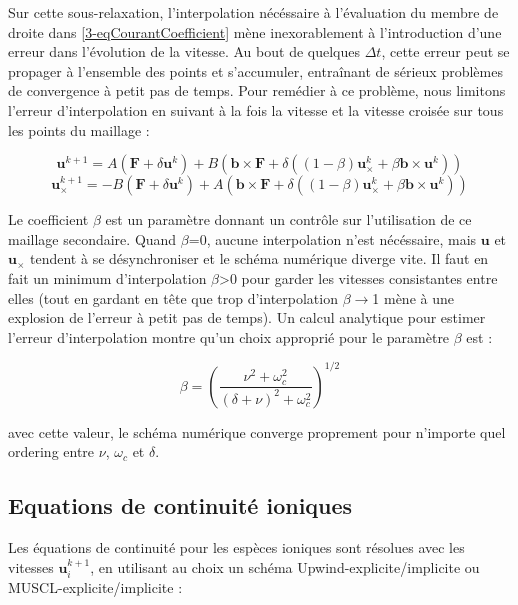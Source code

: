 \begin{refsection}
Sur cette sous-relaxation, l'interpolation nécéssaire à l'évaluation du
membre de droite dans \eqref{3-eqCourantCoefficient} mène inexorablement à l'introduction d'une
erreur dans l'évolution de la vitesse. Au bout de quelques $\Delta t$, cette
erreur peut se propager à l'ensemble des points et s'accumuler,
entraînant de sérieux problèmes de convergence à petit pas de temps. Pour remédier à ce problème, nous
limitons l'erreur d'interpolation en suivant à la fois la vitesse
et la vitesse croisée sur tous les points du maillage :

\begin{equation}
\label{3-eqMvtPonderee}
\mathbf{u}^{k+1}=A\left(\mathbf F + \delta\mathbf{u}^{k}\right)+ B\left(\mathbf
b\times\mathbf F +
\delta\left((1-\beta)\mathbf{u}_\times^{k}+\beta\mathbf
b\times\mathbf{u}^{k}\right)\right)
\end{equation}
\begin{equation}
\label{3-eqMvtPonderee}
\mathbf{u}_\times^{k+1}=-B\left(\mathbf F + \delta\mathbf{u}^{k}\right)+
A\left(\mathbf
b\times\mathbf F +
\delta\left((1-\beta)\mathbf{u}_\times^{k}+\beta\mathbf
b\times\mathbf{u}^{k}\right)\right)
\end{equation}

Le coefficient $\beta$ est un paramètre donnant un contrôle sur
l'utilisation de ce maillage secondaire. Quand $\beta$=0, aucune
interpolation n'est nécéssaire, mais $\mathbf{u}$ et $\mathbf{u}_\times$
tendent à se désynchroniser et le schéma numérique diverge vite. Il faut en
fait un minimum d'interpolation $\beta$>0 pour garder les vitesses consistantes entre elles
(tout en gardant en tête que trop d'interpolation $\beta\rightarrow$1 mène à une
explosion de l'erreur à petit pas de temps). Un calcul analytique pour estimer
l'erreur d'interpolation montre qu'un choix approprié pour le paramètre $\beta$
est :

\begin{equation}
\label{3-eqMvtPonderee}
\beta=\left(\frac{\nu^2+\omega_c^2}{(\delta+\nu)^2+\omega_c^2}\right)^{1/2}
\end{equation}

avec cette valeur, le schéma numérique converge proprement pour n'importe quel
ordering entre $\nu$, $\omega_c$ et $\delta$.

\subsection{Equations de continuité ioniques}
Les équations de continuité pour les espèces ioniques sont résolues avec les
vitesses $\mathbf u_i^{k+1}$, en utilisant au choix un schéma
Upwind-explicite/implicite ou MUSCL-explicite/implicite :


\end{refsection}
